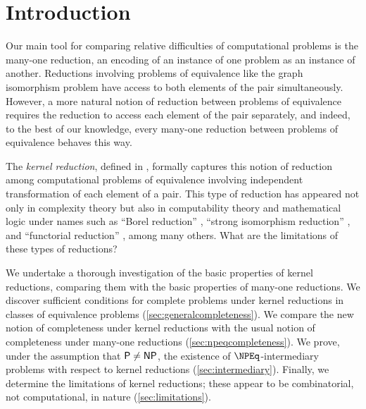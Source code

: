 \section{Introduction}
%
Our main tool for comparing relative difficulties of computational problems is the many-one reduction, an encoding of an instance of one problem as an instance of another.
Reductions involving problems of equivalence like the graph isomorphism problem have access to both elements of the pair simultaneously.
However, a more natural notion of reduction between problems of equivalence requires the reduction to access each element of the pair separately, and indeed, to the best of our knowledge, every many-one reduction between problems of equivalence behaves this way.

The \emph{kernel reduction}, defined in \autocite[Definition~4.13]{fg11}, formally captures this notion of reduction among computational problems of equivalence involving independent transformation of each element of a pair.
This type of reduction has appeared not only in complexity theory but also in computability theory and mathematical logic under names such as ``Borel reduction'' \autocite{fs89}, ``strong isomorphism reduction'' \autocite{bcffm}, and ``functorial reduction'' \autocite{babai14, babai77, kucera76, zkt85}, among many others.
What are the limitations of these types of reductions?

We undertake a thorough investigation of the basic properties of kernel reductions, comparing them with the basic properties of many-one reductions.
We discover sufficient conditions for complete problems under kernel reductions in classes of equivalence problems (\autoref{sec:generalcompleteness}).
We compare the new notion of completeness under kernel reductions with the usual notion of completeness under many-one reductions (\autoref{sec:npeqcompleteness}).
We prove, under the assumption that ${\mathsf{P}} \neq {\ensuremath{\mathsf{NP}}}$, the existence of $\NPEq$-intermediary problems with respect to kernel reductions (\autoref{sec:intermediary}).
Finally, we determine the limitations of kernel reductions; these appear to be combinatorial, not computational, in nature (\autoref{sec:limitations}).

